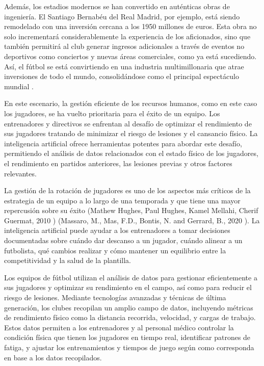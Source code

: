 Además, los estadios modernos se han convertido en auténticas obras de ingeniería. El Santiago Bernabéu del Real Madrid, por ejemplo, está siendo remodelado con una inversión cercana a los 1950 millones de euros. Esta obra no solo incrementará considerablemente la experiencia de los aficionados, sino que también permitirá al club generar ingresos adicionales a través de eventos no deportivos como conciertos y nuevas áreas comerciales, como ya está sucediendo. Así, el fútbol se está convirtiendo en una industria multimillonaria que atrae inversiones de todo el mundo, consolidándose como el principal espectáculo mundial \cite{bernabeu}.

En este escenario, la gestión eficiente de los recursos humanos, como en este caso los jugadores, se ha vuelto prioritaria para el éxito de un equipo. Los entrenadores y directivos se enfrentan al desafío de optimizar el rendimiento de sus jugadores tratando de minimizar el riesgo de lesiones y el cansancio físico. La inteligencia artificial ofrece herramientas potentes para abordar este desafío, permitiendo el análisis de datos relacionados con el estado físico de los jugadores, el rendimiento en partidos anteriores, las lesiones previas y otros factores relevantes.

La gestión de la rotación de jugadores es uno de los aspectos más críticos de la estrategia de un equipo a lo largo de una temporada y que tiene una mayor repercusión sobre su éxito (Mathew Hughes, Paul Hughes, Kamel Mellahi, Cherif Guermat, 2010 \cite{ingleses}) (Massaro, M., Mas, F.D., Bontis, N. and Gerrard, B., 2020 \cite{leeds}). La inteligencia artificial puede ayudar a los entrenadores a tomar decisiones documentadas sobre cuándo dar descanso a un jugador, cuándo alinear a un futbolista, qué cambios realizar y cómo mantener un equilibrio entre la competitividad y la salud de la plantilla. 

Los equipos de fútbol utilizan el análisis de datos para gestionar eficientemente a sus jugadores y optimizar su rendimiento en el campo, así como para reducir el riesgo de lesiones. Mediante tecnologías avanzadas y técnicas de última generación, los clubes recopilan un amplio campo de datos, incluyendo métricas de rendimiento físico como la distancia recorrida, velocidad, y cargas de trabajo. Estos datos permiten a los entrenadores y al personal médico controlar la condición física que tienen los jugadores en tiempo real, identificar patrones de fatiga, y ajustar los entrenamientos y tiempos de juego según como corresponda en base a los datos recopilados. 

